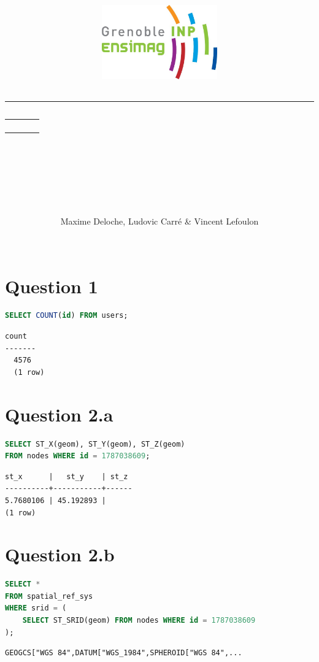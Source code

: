 \documentclass[12pt,a4paper]{article}
\title{
	\begin{flushleft}
		\includegraphics[width=5cm]{logo_ensimag.jpg} \hfill
	\end{flushleft} 
	{\rule{15cm}{1mm}}\vspace{7mm}
	\begin{tabular}{p{0cm} r}
		& {\Huge {\bf \typedeprojet}} \\[20pt]
		& {\huge \nomduprojet}
	\end{tabular}\\
	\vspace{7mm}{\rule{15cm}{1mm}}\vspace{2mm} \\
	\hfill \large \dateduprojet \hspace{2cm}
	\vfill
}
\author{
	\begin{tabular}{p{15cm}}
		\Large Maxime Deloche, Ludovic Carré \& Vincent Lefoulon
	\end{tabular} \\
	\hline
}
\date{}
\begin{document}
\maketitle

\thispagestyle{empty} %
\newpage


\section*{Question 1}

\begin{lstlisting}[language=SQL]
SELECT COUNT(id) FROM users;
\end{lstlisting}

\begin{lstlisting}
count 
-------
  4576
  (1 row)
\end{lstlisting}

\vspace{1cm}
\section*{Question 2.a}

\begin{lstlisting}[language=SQL]
SELECT ST_X(geom), ST_Y(geom), ST_Z(geom)
FROM nodes WHERE id = 1787038609;
\end{lstlisting}

\begin{lstlisting}
st_x      |   st_y    | st_z 
----------+-----------+------
5.7680106 | 45.192893 |     
(1 row)
\end{lstlisting}

\vspace{1cm}
\section*{Question 2.b}

\begin{lstlisting}[language=SQL]
SELECT *
FROM spatial_ref_sys
WHERE srid = (
    SELECT ST_SRID(geom) FROM nodes WHERE id = 1787038609
);
\end{lstlisting}

\begin{lstlisting}
GEOGCS["WGS 84",DATUM["WGS_1984",SPHEROID["WGS 84",...
\end{lstlisting}
\end{document}
